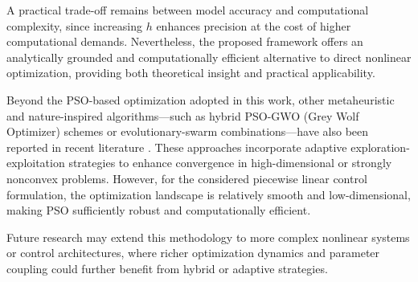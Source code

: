 \documentclass[preprint,12pt]{elsarticle}
\begin{document}
A practical trade-off remains between model accuracy and computational complexity, since increasing \(h\) enhances precision at the cost of higher computational demands. Nevertheless, the proposed framework offers an analytically grounded and computationally efficient alternative to direct nonlinear optimization, providing both theoretical insight and practical applicability.

Beyond the PSO-based optimization adopted in this work, other metaheuristic and nature-inspired algorithms---such as hybrid PSO-GWO (Grey Wolf Optimizer) schemes or evolutionary-swarm com\-bi\-na\-tions---have also been reported in recent literature \cite{Siddiqi2025}. These approaches incorporate adaptive exploration-exploitation strategies to enhance convergence in high-dimensional or strongly nonconvex problems. However, for the considered piecewise linear control formulation, the optimization landscape is relatively smooth and low-dimensional, making PSO sufficiently robust and computationally efficient. 

Future research may extend this methodology to more complex nonlinear systems or control architectures, where richer optimization dynamics and parameter coupling could further benefit from hybrid or adaptive strategies.
 
\end{document}
